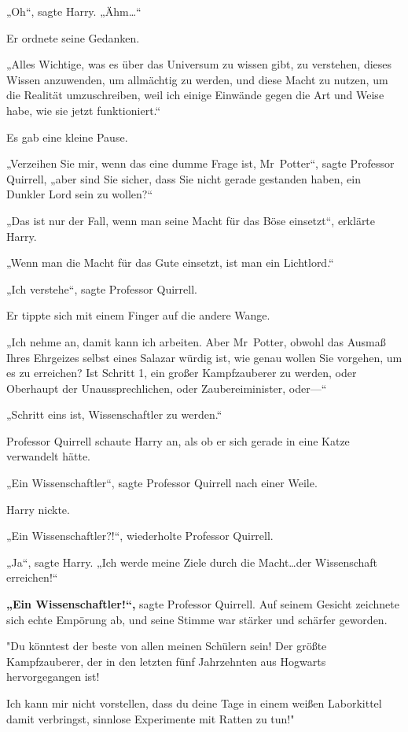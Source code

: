 {„Oh“, sagte Harry. „Ähm…“

Er ordnete seine Gedanken.

„Alles Wichtige, was es über das Universum zu wissen gibt, zu verstehen, dieses Wissen anzuwenden, um allmächtig zu werden, und diese Macht zu nutzen, um die Realität umzuschreiben, weil ich einige Einwände gegen die Art und Weise habe, wie sie jetzt funktioniert.“

Es gab eine kleine Pause.

„Verzeihen Sie mir, wenn das eine dumme Frage ist, Mr~Potter“, sagte Professor Quirrell, „aber sind Sie sicher, dass Sie nicht gerade gestanden haben, ein Dunkler Lord sein zu wollen?“

„Das ist nur der Fall, wenn man seine Macht für das Böse einsetzt“, erklärte Harry.

„Wenn man die Macht für das Gute einsetzt, ist man ein Lichtlord.“

„Ich verstehe“, sagte Professor Quirrell.

Er tippte sich mit einem Finger auf die andere Wange.

„Ich nehme an, damit kann ich arbeiten. Aber Mr~Potter, obwohl das Ausmaß Ihres Ehrgeizes selbst eines Salazar würdig ist, wie genau wollen Sie vorgehen, um es zu erreichen? Ist Schritt 1, ein großer Kampfzauberer zu werden, oder Oberhaupt der Unaussprechlichen, oder Zaubereiminister, oder—“

„Schritt eins ist, Wissenschaftler zu werden.“

Professor Quirrell schaute Harry an, als ob er sich gerade in eine Katze verwandelt hätte.

„Ein Wissenschaftler“, sagte Professor Quirrell nach einer Weile.

Harry nickte.

„Ein Wissenschaftler?!“, wiederholte Professor Quirrell.

„Ja“, sagte Harry. „Ich werde meine Ziele durch die Macht…der Wissenschaft erreichen!“

\textbf{„Ein Wissenschaftler!“,} sagte Professor Quirrell. Auf seinem Gesicht zeichnete sich echte Empörung ab, und seine Stimme war stärker und schärfer geworden.

"Du könntest der beste von allen meinen Schülern sein! Der größte Kampfzauberer, der in den letzten fünf Jahrzehnten aus Hogwarts hervorgegangen ist!

Ich kann mir nicht vorstellen, dass du deine Tage in einem weißen Laborkittel damit verbringst, sinnlose Experimente mit Ratten zu tun!"

}
